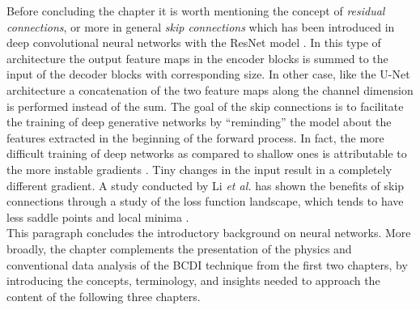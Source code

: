 Before concluding the chapter it is worth mentioning the concept of \textit{residual connections}, or more in 
general \textit{skip connections} which has been introduced in deep convolutional neural networks with the ResNet model 
\cite{he2015deepresiduallearningimage}. In this type of architecture the output feature maps in the encoder blocks
is summed to the input of the decoder blocks with corresponding size. In other case, like the U-Net architecture 
\cite{ronneberger_u-net_2015} a concatenation of the two feature maps along the channel dimension is performed instead 
of the sum. The goal of the skip connections is to facilitate the training of deep generative networks by ``reminding'' 
the model about the features extracted in the beginning of the forward process. In fact, the more difficult training 
of deep networks as compared to shallow ones is attributable to the more instable gradients \cite{balduzzi2018}. Tiny 
changes in the input result in a completely different gradient. A study conducted by Li \textit{et al.} has shown 
the benefits of skip connections through a study of the loss function landscape, which tends to have less saddle points 
and local minima \cite{li_visualizing_2017}. \\

This paragraph concludes the introductory background on neural networks. More broadly, the chapter complements the 
presentation of the physics and conventional data analysis of the BCDI technique from the first two chapters, by 
introducing the concepts, terminology, and insights needed to approach the content of the following three chapters.

